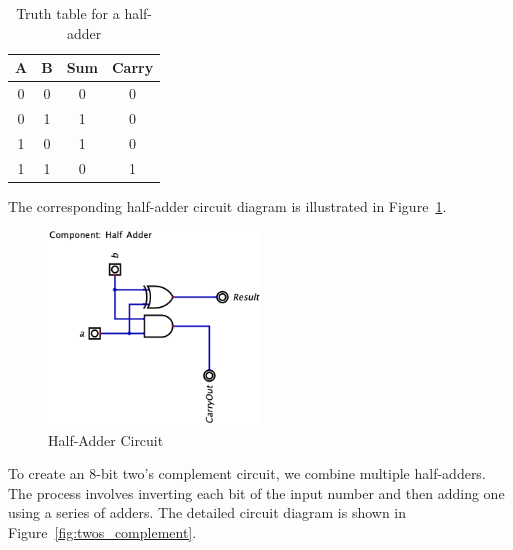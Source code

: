 \documentclass[conference]{IEEEtran}
\begin{document}
\begin{table}[h!]
\centering
\begin{tabular}{|c|c|c|c|}
\hline
A & B & Sum & Carry \\ \hline
0 & 0 &  0  &   0   \\ \hline
0 & 1 &  1  &   0   \\ \hline
1 & 0 &  1  &   0   \\ \hline
1 & 1 &  0  &   1   \\ \hline
\end{tabular}
\caption{Truth table for a half-adder}
\end{table}

The corresponding half-adder circuit diagram is illustrated in Figure~\ref{fig:half_adder}.

\begin{figure}[h!]
\centering
\includegraphics[width=0.5\textwidth]{assets/half_adder.png}
\caption{Half-Adder Circuit}
\label{fig:half_adder}
\end{figure}

To create an 8-bit two's complement circuit, we combine multiple half-adders. The process involves inverting each bit of the input number and then adding one using a series of adders. The detailed circuit diagram is shown in Figure~\ref{fig:twos_complement}.
\end{document}

